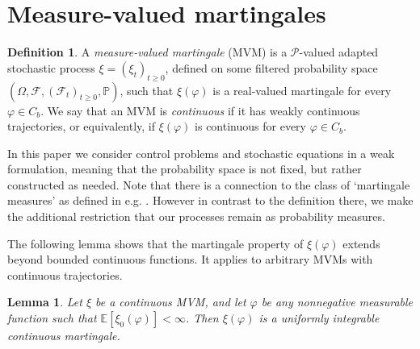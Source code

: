 \documentclass{article}
\newtheorem{lemma}[theorem]{Lemma}
\theoremstyle{definition}
\newtheorem{definition}[theorem]{Definition}
\numberwithin{equation}{section}
\numberwithin{theorem}{section}
\newcommand{\E}{\mathbb{E}}
\renewcommand{\P}{\mathbb{P}}
\newcommand{\eg}{e.g.}
\renewcommand{\P}{{\mathbb P}}
\newcommand{\Fcal}{{\mathcal F}}
\newcommand{\Pcal}{{\mathcal P}}
\begin{document}
\section{Measure-valued martingales}
\label{sec:meas-valu-mart}

\begin{definition}
A \emph{measure-valued martingale} (MVM) is a $\Pcal$-valued adapted stochastic process $\xi=(\xi_t)_{t\ge0}$, defined on some filtered probability space $(\Omega,\Fcal,(\Fcal_t)_{t\ge0},\P)$, such that $\xi(\varphi)$ is a real-valued martingale for every $\varphi\in C_b$. We say that an MVM is \emph{continuous} if it has weakly continuous trajectories, or equivalently, if $\xi(\varphi)$ is continuous for every $\varphi\in C_b$.
\end{definition}

In this paper we consider control problems and stochastic equations in a weak formulation, meaning that the probability space is not fixed, but rather constructed as needed. Note that there is a connection to the class of `martingale measures' as defined in \eg{} \cite{dawson1993}. However in contrast to the definition there, we make the additional restriction that our processes remain as probability measures.

The following lemma shows that the martingale property of $\xi(\varphi)$ extends beyond bounded continuous functions. It applies to arbitrary MVMs with continuous trajectories.

\begin{lemma}\label{L_lin_fcn}
Let $\xi$ be a continuous MVM, and let $\varphi$ be any nonnegative measurable function such that $\E[\xi_0(\varphi)]<\infty$. Then $\xi(\varphi)$ is a uniformly integrable continuous martingale.
\end{lemma}
\end{document}
